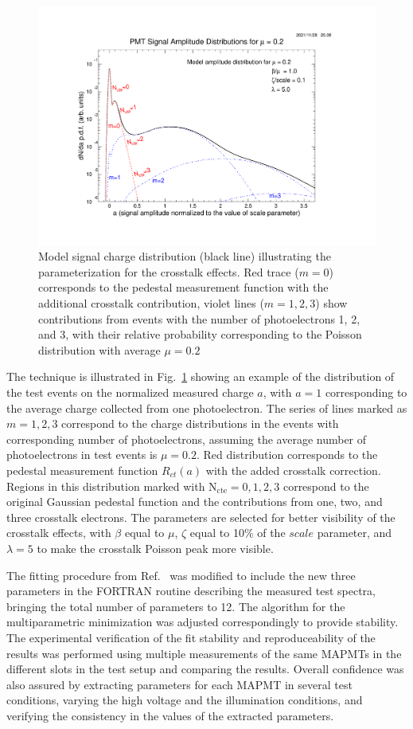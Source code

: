 \begin{figure}[hbt]
	\centering
	\includegraphics[trim=90 60 110 100, clip, width=\linewidth]{figures/model.pdf}
	\caption{Model signal charge distribution (black line) illustrating the parameterization for the crosstalk effects. Red trace ($m = 0$) corresponds to the pedestal measurement function with the additional crosstalk contribution, violet lines ($m = 1, 2, 3$) show contributions from events with the number of photoelectrons 1, 2, and 3, with their relative probability corresponding to the Poisson distribution with average $\mu = 0.2$  }
	\label{fig:Model}
\end{figure}

The technique is illustrated in Fig.~\ref{fig:Model} showing an example of the distribution of the test events on the normalized measured charge $a$, with $a=1$ corresponding to the average charge collected from one photoelectron. The series of lines marked as $m = 1, 2, 3$ correspond to the charge distributions in the events with corresponding number of photoelectrons, assuming the average number of photoelectrons in test events is $\mu = 0.2$. Red distribution corresponds to the pedestal measurement function $R_{ct}(a)$ with the added crosstalk correction. Regions in this distribution marked with $\mathrm{N_{cte}=0, 1, 2, 3}$ correspond to the original Gaussian pedestal function and the contributions from one, two, and three crosstalk electrons. The parameters are selected for better visibility of the crosstalk effects, with $\beta$ equal to $\mu$, $\zeta$ equal to 10\% of the $scale$ parameter, and $\lambda = 5$ to make the crosstalk Poisson peak more visible.  

The fitting procedure from Ref.~\cite{DEGTIARENKO20171} was modified to include the new three parameters in the FORTRAN routine describing the measured test spectra, bringing the total number of parameters to 12. The algorithm for the multiparametric minimization was adjusted correspondingly to provide stability. The experimental verification of the fit stability and reproduceability of the results was performed using multiple measurements of the same MAPMTs in the different slots in the test setup and comparing the results. Overall confidence was also assured by extracting parameters for each MAPMT in several test conditions, varying the high voltage and the illumination conditions, and verifying the consistency in the values of the extracted parameters. 
